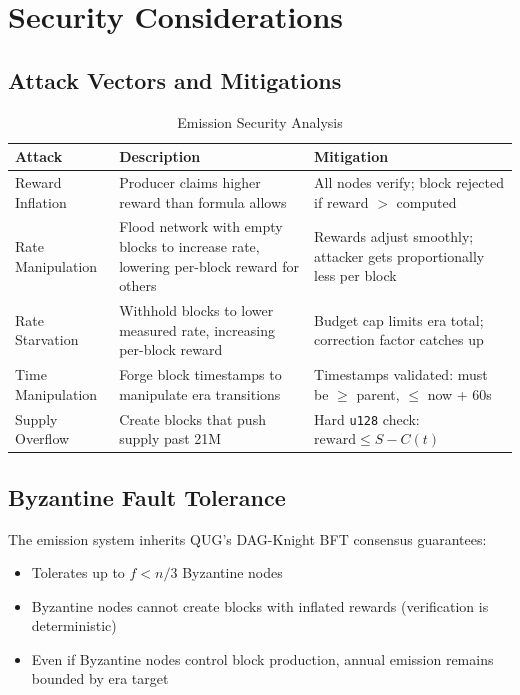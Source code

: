 \documentclass[11pt,a4paper]{article}
\begin{document}
\section{Security Considerations}

\subsection{Attack Vectors and Mitigations}

\begin{table}[H]
\centering
\caption{Emission Security Analysis}
\begin{tabular}{@{}p{3.5cm}p{5cm}p{5cm}@{}}
\toprule
\textbf{Attack} & \textbf{Description} & \textbf{Mitigation} \\
\midrule
Reward Inflation & Producer claims higher reward than formula allows & All nodes verify; block rejected if reward $>$ computed \\
Rate Manipulation & Flood network with empty blocks to increase rate, lowering per-block reward for others & Rewards adjust smoothly; attacker gets proportionally less per block \\
Rate Starvation & Withhold blocks to lower measured rate, increasing per-block reward & Budget cap limits era total; correction factor catches up \\
Time Manipulation & Forge block timestamps to manipulate era transitions & Timestamps validated: must be $\geq$ parent, $\leq$ now + 60s \\
Supply Overflow & Create blocks that push supply past 21M & Hard \texttt{u128} check: $\text{reward} \leq S - C(t)$ \\
\bottomrule
\end{tabular}
\end{table}

\subsection{Byzantine Fault Tolerance}

The emission system inherits QUG's DAG-Knight BFT consensus guarantees:
\begin{itemize}
    \item Tolerates up to $f < n/3$ Byzantine nodes
    \item Byzantine nodes cannot create blocks with inflated rewards (verification is deterministic)
    \item Even if Byzantine nodes control block production, annual emission remains bounded by era target
\end{itemize}
\end{document}

